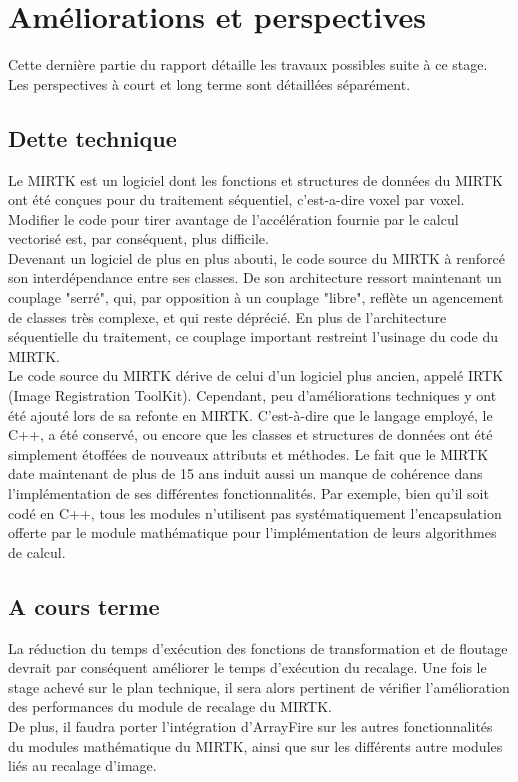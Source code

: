 \documentclass[10pt]{report}
\begin{document}
\chapter{Améliorations et perspectives} \vspace{-1cm}
Cette dernière partie du rapport détaille les travaux possibles suite à ce stage. Les perspectives à court et long terme sont détaillées séparément.
\section{Dette technique}

	Le MIRTK est un logiciel dont les fonctions et structures de données du MIRTK ont été conçues pour du traitement séquentiel, c'est-a-dire voxel par voxel. Modifier le code pour tirer avantage de l'accélération fournie par le calcul vectorisé est, par conséquent, plus difficile.\\
	
	Devenant un logiciel de plus en plus abouti, le code source du MIRTK à renforcé son interdépendance entre ses classes. De son architecture ressort maintenant un couplage "serré", qui, par opposition à un couplage "libre", reflète un agencement de classes très complexe, et qui reste déprécié. En plus de l'architecture séquentielle du traitement, ce couplage important restreint l'usinage du code du MIRTK.\\
	
	Le code source du MIRTK dérive de celui d'un logiciel plus ancien, appelé IRTK (Image Registration ToolKit). Cependant, peu d'améliorations techniques y ont été ajouté lors de sa refonte en MIRTK. C'est-à-dire que le langage employé, le C++, a été conservé, ou encore que les classes et structures de données ont été simplement étoffées de nouveaux attributs et méthodes. Le fait que le MIRTK date maintenant de plus de 15 ans induit aussi un manque de cohérence dans l'implémentation de ses différentes fonctionnalités. Par exemple, bien qu'il soit codé en C++, tous les modules n'utilisent pas systématiquement l'encapsulation offerte par le module mathématique pour l'implémentation de leurs algorithmes de calcul. 

	\section{A cours terme}
	 La réduction du temps d'exécution des fonctions de transformation et de floutage devrait par conséquent améliorer le temps d'exécution du recalage. Une fois le stage achevé sur le plan technique, il sera alors pertinent de vérifier l'amélioration des performances du module de recalage du MIRTK.\\
	 De plus, il faudra porter l'intégration d'ArrayFire sur les autres fonctionnalités du modules mathématique du MIRTK, ainsi que sur les différents autre modules liés au recalage d'image.
\end{document}
